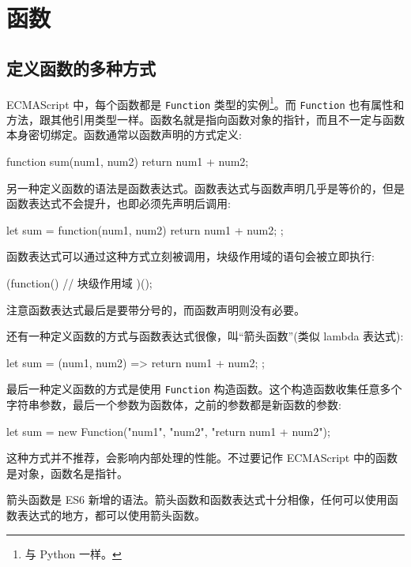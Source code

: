 \section{函数}

\subsection{定义函数的多种方式}

ECMAScript 中，每个函数都是 \texttt{Function} 类型的实例\footnote{与 Python 一样。}。而 \texttt{Function} 也有属性和方法，跟其他引用类型一样。函数名就是指向函数对象的指针，而且不一定与函数本身密切绑定。函数通常以函数声明的方式定义:

\begin{JavaScript}
function sum(num1, num2) {
    return num1 + num2;
}
\end{JavaScript}

另一种定义函数的语法是函数表达式。函数表达式与函数声明几乎是等价的，但是函数表达式不会提升，也即必须先声明后调用:

\begin{JavaScript}
let sum = function(num1, num2) {
    return num1 + num2;
};
\end{JavaScript}

函数表达式可以通过这种方式立刻被调用，块级作用域的语句会被立即执行:

\begin{JavaScript}
(function() {   
    // 块级作用域
})(); 
\end{JavaScript}

注意函数表达式最后是要带分号的，而函数声明则没有必要。

还有一种定义函数的方式与函数表达式很像，叫``箭头函数''(类似 lambda 表达式):

\begin{JavaScript}
let sum = (num1, num2) => {
    return num1 + num2;
};
\end{JavaScript}

最后一种定义函数的方式是使用 \texttt{Function} 构造函数。这个构造函数收集任意多个字符串参数，最后一个参数为函数体，之前的参数都是新函数的参数:

\begin{JavaScript}
let sum = new Function("num1", "num2", "return num1 + num2");
\end{JavaScript}

这种方式并不推荐，会影响内部处理的性能。不过要记作 ECMAScript 中的函数是对象，函数名是指针。

箭头函数是 ES6 新增的语法。箭头函数和函数表达式十分相像，任何可以使用函数表达式的地方，都可以使用箭头函数。

